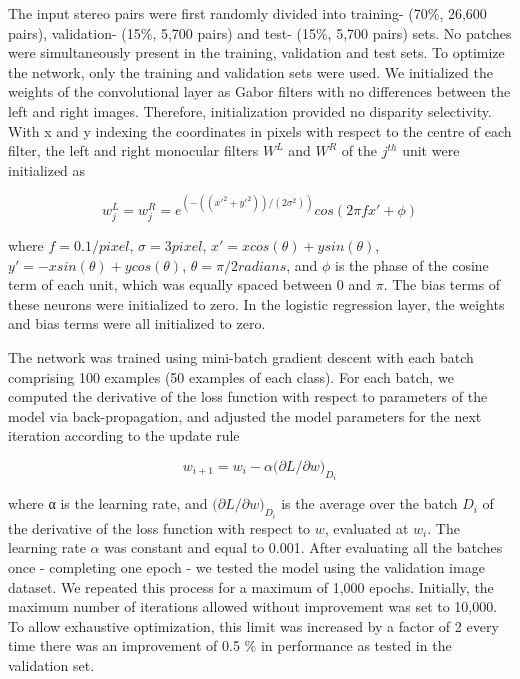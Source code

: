 The input stereo pairs were first randomly divided into training- (70\%, 26,600 pairs), validation- (15\%, 5,700 pairs) and test- (15\%, 5,700 pairs) sets. No patches were simultaneously present in the training, validation and test sets. To optimize the network, only the training and validation sets were used. We initialized the weights of the convolutional layer as Gabor filters with no differences between the left and right images. Therefore, initialization provided no disparity selectivity. With x and y indexing the coordinates in pixels with respect to the centre of each filter, the left and right monocular filters $W^L$ and $W^R$ of the $j^{th}$ unit were initialized as

\begin{equation} 
w_j^L =w_j^R = e^{(-((x'^2+ y'^2))/(2 \sigma^2 ))}  cos⁡(2 \pi f x'+\phi)
\end{equation}

where $f=0.1/pixel$, $\sigma=3 pixel$, $x'=xcos(\theta)+ysin(\theta)$, $y'=-xsin(\theta)+ycos(\theta)$, $\theta=\pi / 2 radians$, and $\phi$ is the phase of the cosine term of each unit, which was equally spaced between $0$ and $\pi$. The bias terms of these neurons were initialized to zero. In the logistic regression layer, the weights and bias terms were all initialized to zero. 

The network was trained using mini-batch gradient descent with each batch comprising 100 examples (50 examples of each class). For each batch, we computed the derivative of the loss function with respect to parameters of the model via back-propagation, and adjusted the model parameters for the next iteration according to the update rule

\begin{equation}
w_{i+1}=w_i - \alpha \big( \partial L / \partial w \big)_{D_i }
\end{equation}

where α is the learning rate, and $ \big( \partial L / \partial w \big)_{D_i}$ is the average over the batch $D_i$ of the derivative of the loss function with respect to $w$, evaluated at $w_i$. The learning rate $\alpha$ was constant and equal to 0.001.
After evaluating all the batches once - completing one epoch - we tested the model using the validation image dataset. We repeated this process for a maximum of 1,000 epochs. Initially, the maximum number of iterations allowed without improvement was set to 10,000. To allow exhaustive optimization, this limit was increased by a factor of 2 every time there was an improvement of 0.5 \% in performance as tested in the validation set.

